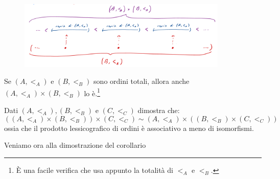 \begin{figure}[H]
	\centering
	\includegraphics[width = 10cm]{immagini/ordine_lessicografico.png}
\end{figure}

\begin{remark}
	Se $(A, <_A)$ e $(B,<_B)$ sono ordini totali, allora anche $(A,<_A) \times (B,<_B)$ lo è.\footnote{È una facile verifica che usa appunto la totalità di $<_A$ e $<_B$.}
\end{remark}

\begin{exercise}
	Dati $(A,<_A),(B,<_B)$ e $(C,<_C)$ dimostra che:
	\[ ((A,<_A) \times (B,<_B)) \times (C,<_C) \sim (A,<_A) \times ((B,<_B) \times (C,<_C))
		\]
	ossia che il prodotto lessicografico di ordini è associativo a meno di isomorfismi.
\end{exercise}

Veniamo ora alla dimostrazione del corollario

